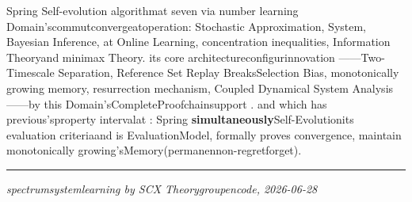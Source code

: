 \documentclass[
  12pt,
]{article}
\begin{document}
Spring
Self-evolution algorithmat seven via number learning Domain'scommutconvergeatoperation: Stochastic Approximation, System, Bayesian Inference, at Online Learning, concentration inequalities, Information Theoryand 
minimax
Theory. its core architectureconfigurinnovation ------Two-Timescale Separation, Reference Set Replay BreaksSelection Bias, monotonically growing memory, resurrection mechanism, Coupled Dynamical System Analysis------by this Domain'sCompleteProofchainsupport . and which has previous'sproperty intervalat : Spring
\textbf{simultaneously}Self-Evolutionits evaluation criteriaand is EvaluationModel, formally proves convergence, maintain monotonically growing'sMemory(permanennon-regretforget). 

\begin{center}\rule{0.5\linewidth}{0.5pt}\end{center}

\emph{spectrumsystemlearning by  SCX Theorygroupencode, 2026-06-28}
\end{document}

